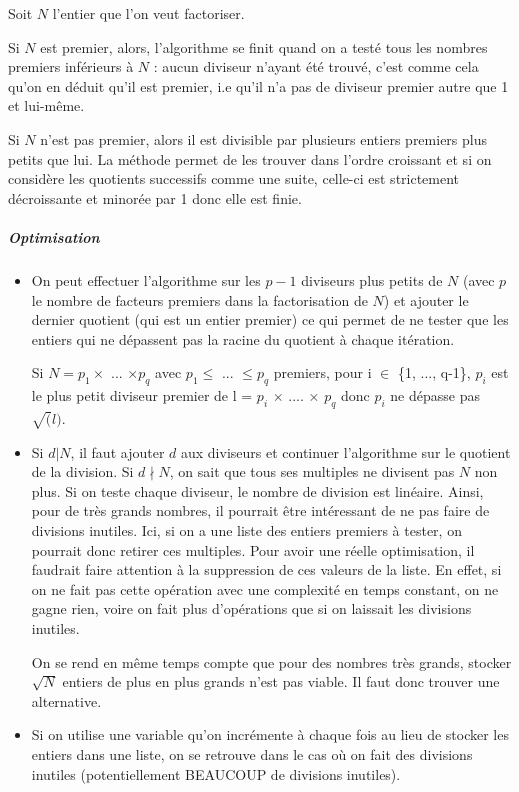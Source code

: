 \documentclass[11pt,a4paper]{article}
\begin{document}
	Soit $\mathit{N}$ l'entier que l'on veut factoriser. 
	
	Si $\mathit{N}$ est premier, alors, l'algorithme se finit quand on a testé tous les nombres premiers inférieurs à $\mathit{N}$ : aucun diviseur n'ayant été trouvé, c'est comme cela qu'on en déduit qu'il est premier, i.e qu'il n'a pas de diviseur premier autre que 1 et lui-même. 
	
	Si $\mathit{N}$ n'est pas premier, alors il est divisible par plusieurs entiers premiers plus petits que lui. La méthode permet de les trouver dans l'ordre croissant et si on considère les quotients successifs comme une suite, celle-ci est strictement décroissante et minorée par 1 donc elle est finie.
	
	\subparagraph{Optimisation}
	\begin{itemize}	
		\item On peut effectuer l'algorithme sur les $\mathit{p-1}$ diviseurs plus petits de $\mathit{N}$ (avec $\mathit{p}$ le nombre de facteurs premiers dans la factorisation de $\mathit{N}$) et ajouter le dernier quotient (qui est un entier premier) ce qui permet de ne tester que les entiers qui ne dépassent pas la racine du quotient à chaque itération.
		
		Si $N = p_1 \times$ ... $\times p_q$ avec $p_1 \leq$ ... $\leq p_q$ premiers, pour i $\in$ \{1, ..., q-1\}, $p_i$ est le plus petit diviseur premier de l = $p_i$ $\times$ .... $\times$ $p_q$ donc $p_i$ ne dépasse pas $\sqrt(l)$.
		
		\item Si $\mathit{d|N}$, il faut ajouter $\mathit{d}$ aux diviseurs et continuer l'algorithme sur le quotient de la division. Si $\mathit{d \nmid N}$, on sait que tous ses multiples ne divisent pas $\mathit{N}$ non plus. Si on teste chaque diviseur, le nombre de division est linéaire. Ainsi, pour de très grands nombres, il pourrait être intéressant de ne pas faire de divisions inutiles. Ici, si on a une liste des entiers premiers à tester, on pourrait donc retirer ces multiples. Pour avoir une réelle optimisation, il faudrait faire attention à la suppression de ces valeurs de la liste. En effet, si on ne fait pas cette opération avec une complexité en temps constant, on ne gagne rien, voire on fait plus d'opérations que si on laissait les divisions inutiles. 
		
		On se rend en même temps compte que pour des nombres très grands, stocker $\sqrt{N}$ entiers de plus en plus grands n'est pas viable. Il faut donc trouver une alternative.
		
		\item Si on utilise une variable qu'on incrémente à chaque fois au lieu de stocker les entiers dans une liste, on se retrouve dans le cas où on fait des divisions inutiles (potentiellement BEAUCOUP de divisions inutiles).
	\end{itemize}
	
\end{document}
